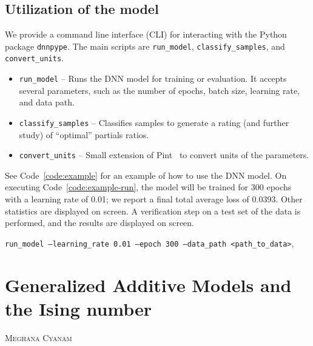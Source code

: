 \documentclass{psu-report}
\newenvironment{code}{\begin{listing}}{\end{listing}}
\newcommand{\chapterauthor}[1]{%
  \vspace{-2em}
  {\large \textsc{#1}\par}
  \vspace{1.5em}
}
\begin{document}
\section{Utilization of the model}

We provide a command line interface (CLI) for interacting with the Python
package \texttt{dnnpype}.
The main scripts are \texttt{run\_model}, \texttt{classify\_samples}, and
\texttt{convert\_units}.
\begin{itemize}
    \item \texttt{run\_model} -- Runs the DNN model for training or evaluation.
        It accepts several parameters, such as the number of epochs, batch size,
        learning rate, and data path.
    \item \texttt{classify\_samples} -- Classifies samples to generate a rating
        (and further study) of ``optimal'' partials ratios.
    \item \texttt{convert\_units} -- Small extension of Pint~\autocite{2025Pint-1}
        to convert units of the parameters.
\end{itemize}
See Code~\autoref{code:example} for an example of how to use the DNN model.
On executing Code~\autoref{code:example-run}, 
the model will be trained for 300 epochs with a learning rate of 0.01;
we report a final total average loss of \(0.0393\).
Other statistics are displayed on screen.
A verification step on a test set of the data is performed, and the results are
displayed on screen.

\begin{code}
\label{code:example-run}
\texttt{run_model --learning_rate 0.01 --epoch 300 --data_path <path_to_data>},
\end{code}





\chapter{Generalized Additive Models and the Ising number}
\chapterauthor{Meghana Cyanam}


\nocite{*} %
\printchicagobibliography


\end{document}
